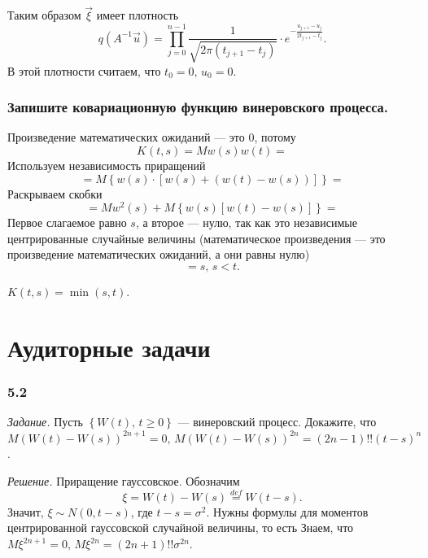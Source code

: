 Таким образом $ \vec{ \xi }$ имеет плотность
$$q \left( A^{-1} \vec{u} \right) =
  \prod \limits_{j = 0}^{n - 1}
    \frac{1}{ \sqrt{2 \pi \left( t_{j + 1} - t_j \right) }} \cdot e^{-\frac{u_{j + 1} - u_j}{2t_{j + 1} - t_j}}.$$
В этой плотности считаем, что $t_0 = 0, \, u_0 = 0$.

\subsubsection*{Запишите ковариационную функцию винеровского процесса.}

Произведение математических ожиданий --- это 0, потому
$$K \left( t, s \right) =
  Mw \left( s \right) w \left( t \right) =$$
Используем независимость приращений
$$= M \left\{
    w \left( s \right) \cdot
    \left[ w \left( s \right) + \left( w \left( t \right) - w \left( s \right) \right) \right]
  \right\} =$$
Раскрываем скобки
$$= Mw^2 \left(s \right) +
  M \left\{ w \left( s \right) \left[ w \left( t \right) - w \left( s \right) \right] \right\} =$$
Первое слагаемое равно $s$, а второе --- нулю,
так как это независимые центрированные случайные величины (математическое произведения ---
это произведение математических ожиданий, а они равны нулю)
$$= s, \,
  s < t.$$

$K \left( t, s \right) = \min \left( s, t \right) $.

\section*{Аудиторные задачи}

\subsubsection*{5.2}

\textit{Задание.}
Пусть $ \left\{ W \left( t \right), \, t \geq 0 \right\} $ --- винеровский процесс.
Докажите, что
$M \left( W \left( t \right) - W \left( s \right) \right)^{2n + 1} = 0, \,
  M \left( W \left( t \right) - W \left( s \right) \right)^{2n} =
  \left( 2n - 1 \right)!! \left( t - s \right)^n$.

\textit{Решение.}
Приращение гауссовское.
Обозначим
$$ \xi =
  W \left( t \right) - W \left( s \right) \overset{def}{=}
  W \left( t - s \right).$$
Значит, $ \xi \sim N \left( 0, t - s \right) $, где $t - s = \sigma^2$.
Нужны формулы для моментов центрированной гауссовской случайной величины, то есть
Знаем, что $M \xi^{2n + 1} = 0, \, M \xi^{2n} = \left( 2n + 1 \right)!! \sigma^{2n}$.

